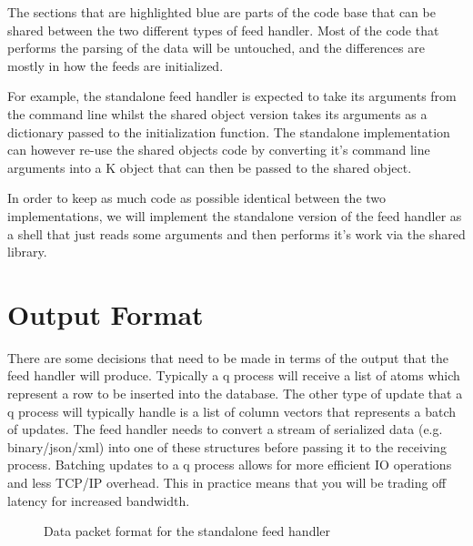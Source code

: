 The sections that are highlighted blue are parts of the code base that can be
shared between the two different types of feed handler. Most of the code that
performs the parsing of the data will be untouched, and the differences are
mostly in how the feeds are initialized.

For example, the standalone feed handler is expected to take its arguments
from the command line whilst the shared object version takes its arguments
as a dictionary passed to the initialization function. The standalone 
implementation can however re-use the shared objects code by converting it's
command line arguments into a K object that can then be passed to the 
shared object.

In order to keep as much code as possible identical between the two 
implementations, we will implement the standalone version of the feed handler
as a shell that just reads some arguments and then performs it's work via 
the shared library.

\section{Output Format}

There are some decisions that need to be made in terms of the output that the
feed handler will produce. Typically a q process will receive a list of atoms
which represent a row to be inserted into the database. The other type of update
that a q process will typically handle is a list of column vectors that represents
a batch of updates. The feed handler needs to convert a stream of serialized data
(e.g. binary/json/xml) into one of these structures before passing it to the receiving
process. Batching updates to a q process allows for more efficient IO operations
and less TCP/IP overhead. This in practice means that you will be trading off latency
for increased bandwidth.

 \begin{figure}[H]
 	\centering
 	\caption{Data packet format for the standalone feed handler}
 	\label{datapacketformat}
 \end{figure}


